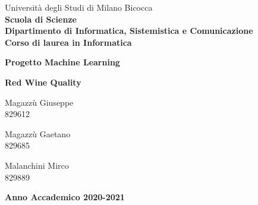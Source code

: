 \begin{titlepage}

\begingroup
\noindent
\begin{minipage}[t]{0.18\textwidth}
\end{minipage}%
\hfill
\begin{minipage}[t]{0.82\textwidth}\raggedright
  Università degli Studi di Milano Bicocca \\
  \small\textbf{Scuola di Scienze} \\
  \small\textbf{Dipartimento di Informatica, Sistemistica e Comunicazione}\\
  \small\textbf{Corso di laurea in Informatica} \\
\end{minipage}%
\par\endgroup

\vspace{35mm}

\begin{center}
  {\huge{\textbf{Progetto Machine Learning}}}

  \vspace{8mm}

  {\Huge{\textbf{Red Wine Quality}}}
\end{center}

\vspace{25mm}

\begin{center}
  \large{Magazzù Giuseppe} \\ \large{829612}

  \vspace{4mm}
  \large{Magazzù Gaetano} \\ \large{829685}

  \vspace{4mm}
  \large{Malanchini Mirco} \\ \large{829889}
\end{center}

\vspace{30mm}
\begin{center}
  {\large{\bf Anno Accademico 2020-2021}}
\end{center}

\restoregeometry

\end{titlepage}
